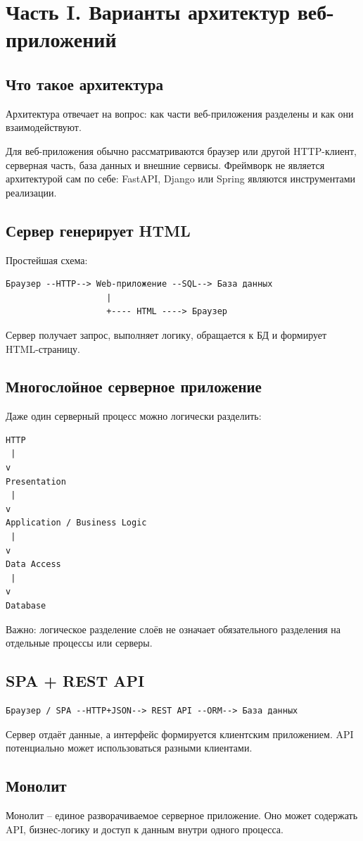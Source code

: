 \documentclass[12pt,a4paper]{article}
\begin{document}
\section{Часть I. Варианты архитектур веб-приложений}
\subsection{Что такое архитектура}
Архитектура отвечает на вопрос: как части веб-приложения разделены и как они взаимодействуют.

Для веб-приложения обычно рассматриваются браузер или другой HTTP-клиент, серверная часть, база данных и внешние сервисы. Фреймворк не является архитектурой сам по себе: FastAPI, Django или Spring являются инструментами реализации.

\subsection{Сервер генерирует HTML}
Простейшая схема:
\begin{verbatim}
Браузер --HTTP--> Web-приложение --SQL--> База данных
                    |
                    +---- HTML ----> Браузер
\end{verbatim}
Сервер получает запрос, выполняет логику, обращается к БД и формирует HTML-страницу.

\subsection{Многослойное серверное приложение}
Даже один серверный процесс можно логически разделить:
\begin{verbatim}
HTTP
 |
v
Presentation
 |
v
Application / Business Logic
 |
v
Data Access
 |
v
Database
\end{verbatim}
Важно: логическое разделение слоёв не означает обязательного разделения на отдельные процессы или серверы.

\subsection{SPA + REST API}
\begin{verbatim}
Браузер / SPA --HTTP+JSON--> REST API --ORM--> База данных
\end{verbatim}
Сервер отдаёт данные, а интерфейс формируется клиентским приложением. API потенциально может использоваться разными клиентами.

\subsection{Монолит}
Монолит -- единое разворачиваемое серверное приложение. Оно может содержать API, бизнес-логику и доступ к данным внутри одного процесса.
\end{document}
